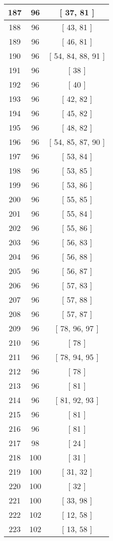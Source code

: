 \begin{center}
\begin{longtable}[H]{|| c c c ||}
187 & 96 & [ 37, 81 ]
\\\hline
188 & 96 & [ 43, 81 ]
\\\hline
189 & 96 & [ 46, 81 ]
\\\hline
190 & 96 & [ 54, 84, 88, 91 ]
\\\hline
191 & 96 & [ 38 ]
\\\hline
192 & 96 & [ 40 ]
\\\hline
193 & 96 & [ 42, 82 ]
\\\hline
194 & 96 & [ 45, 82 ]
\\\hline
195 & 96 & [ 48, 82 ]
\\\hline
196 & 96 & [ 54, 85, 87, 90 ]
\\\hline
197 & 96 & [ 53, 84 ]
\\\hline
198 & 96 & [ 53, 85 ]
\\\hline
199 & 96 & [ 53, 86 ]
\\\hline
200 & 96 & [ 55, 85 ]
\\\hline
201 & 96 & [ 55, 84 ]
\\\hline
202 & 96 & [ 55, 86 ]
\\\hline
203 & 96 & [ 56, 83 ]
\\\hline
204 & 96 & [ 56, 88 ]
\\\hline
205 & 96 & [ 56, 87 ]
\\\hline
206 & 96 & [ 57, 83 ]
\\\hline
207 & 96 & [ 57, 88 ]
\\\hline
208 & 96 & [ 57, 87 ]
\\\hline
209 & 96 & [ 78, 96, 97 ]
\\\hline
210 & 96 & [ 78 ]
\\\hline
211 & 96 & [ 78, 94, 95 ]
\\\hline
212 & 96 & [ 78 ]
\\\hline
213 & 96 & [ 81 ]
\\\hline
214 & 96 & [ 81, 92, 93 ]
\\\hline
215 & 96 & [ 81 ]
\\\hline
216 & 96 & [ 81 ]
\\\hline
217 & 98 & [ 24 ]
\\\hline
218 & 100 & [ 31 ]
\\\hline
219 & 100 & [ 31, 32 ]
\\\hline
220 & 100 & [ 32 ]
\\\hline
221 & 100 & [ 33, 98 ]
\\\hline
222 & 102 & [ 12, 58 ]
\\\hline
223 & 102 & [ 13, 58 ]
\\\hline

\end{longtable}
\end{center}
